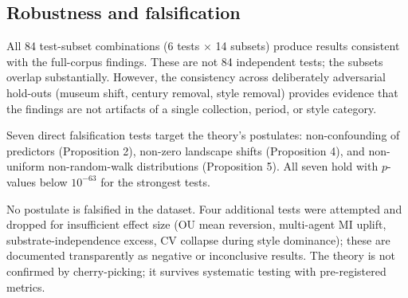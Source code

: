 \subsection{Robustness and falsification}

All 84 test-subset combinations (6 tests $\times$ 14 subsets) produce results consistent with the full-corpus findings. These are not 84 independent tests; the subsets overlap substantially. However, the consistency across deliberately adversarial hold-outs (museum shift, century removal, style removal) provides evidence that the findings are not artifacts of a single collection, period, or style category.

Seven direct falsification tests target the theory's postulates: non-confounding of predictors (Proposition 2), non-zero landscape shifts (Proposition 4), and non-uniform non-random-walk distributions (Proposition 5). All seven hold with $p$-values below $10^{-63}$ for the strongest tests.

No postulate is falsified in the dataset. Four additional tests were attempted and dropped for insufficient effect size (OU mean reversion, multi-agent MI uplift, substrate-independence excess, CV collapse during style dominance); these are documented transparently as negative or inconclusive results. The theory is not confirmed by cherry-picking; it survives systematic testing with pre-registered metrics.
